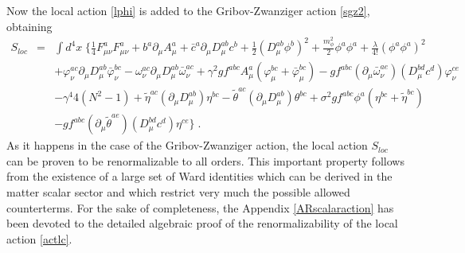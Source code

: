 Now the local action \eqref{lphi} is added to the Gribov-Zwanziger action \eqref{sgz2},
obtaining 
\begin{eqnarray}
\label{actlc}
S_{ loc} &=& \int d^4x\; \Biggl\{
\frac{1}{4}F^a_{\mu\nu} F^a_{\mu\nu}
+ b^{a}\partial_{\mu}A^{a}_{\mu}
+ \bar{c}^{a}\partial_{\mu}D^{ab}_{\mu}c^{b}
+ \frac{1}{2}(D^{ab}_{\mu}\phi^{b})^{2}  + \frac{m^2_{\phi}}{2} \phi^a \phi^a
+ \frac{\lambda}{4!}(\phi^{a}\phi^{a})^{2}
\nonumber \\
&&
+ \varphi^{ac}_{\nu}\partial_{\mu}D^{ab}_{\mu}\bar{\varphi}^{bc}_{\nu}
- \omega^{ac}_{\nu}\partial_{\mu}D^{ab}_{\mu}\bar{\omega}^{ac}_{\nu}
+ \gamma^{2}gf^{abc}A^{a}_{\mu}(\varphi^{bc}_{\mu} + \bar{\varphi}^{bc}_{\mu})
- gf^{abc}(\partial_{\mu}\bar{\omega}^{ae}_{\nu})(D^{bd}_{\mu}c^{d})\varphi^{ce}_\nu
\nonumber \\
&&
- \gamma^{4}4(N^{2}-1)
+ \tilde{\eta}^{ac}(\partial_{\mu} D^{ab}_{\mu})\eta^{bc}
- \tilde{\theta}^{ac}(\partial_{\mu} D^{ab}_{\mu})\theta^{bc}
+ \sigma^{2}gf^{abc}\phi^{a}(\eta^{bc} + \tilde{\eta}^{bc})
\nonumber \\
&&
- gf^{abc}(\partial_{\mu}\tilde{\theta}^{ae})(D^{bd}_{\mu}c^{d})\eta^{ce}
\Biggr\}
\;.
\end{eqnarray}
As it happens in the case of the Gribov-Zwanziger action, the local action  $S_{ loc}$ can be
proven to be renormalizable to all orders. This important property follows from the existence
of a large set of Ward identities which can be derived in the matter scalar sector and which
restrict very much the possible allowed counterterms.  For the sake of completeness, the
Appendix \ref{ARscalaraction} has been devoted to the detailed algebraic proof of the
renormalizability of the local action \eqref{actlc}. 

